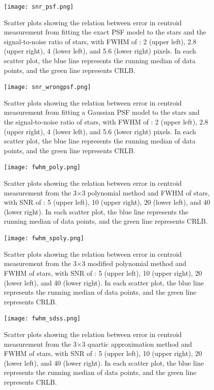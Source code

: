 \documentclass[12pt, preprint]{aastex}
\begin{document}
\begin{figure}[!htb]
  \texttt{[image: snr\_psf.png]}
\endminipage
\caption{Scatter plots showing the relation between error in centroid measurement
from fitting the exact PSF model to the stars and the signal-to-noise ratio of stars,
with FWHM of : 2 (upper left), 2.8 (upper right), 4 (lower left), and 5.6 (lower right)
pixels. In each scatter plot, the blue line represents the running median of data points,
and the green line represents CRLB.}\label{5}
\end{figure}

\begin{figure}[!htb]
  \texttt{[image: snr\_wrongpsf.png]}
\endminipage
\caption{Scatter plots showing the relation between error in centroid
measurement from fitting a Gaussian PSF model to the stars and the signal-to-noise
ratio of stars, with FWHM of : 2 (upper left), 2.8 (upper right), 4 (lower left),
and 5.6 (lower right) pixels. In each scatter plot, the blue line represents the
running median of data points, and the green line represents CRLB.}\label{6}
\end{figure}

\begin{figure}[!htb]
  \texttt{[image: fwhm\_poly.png]}
\endminipage
\caption{Scatter plots showing the relation between error in centroid measurement
from the 3$\times$3 polynomial method and FWHM of stars, with SNR  of : 5 (upper left),
10 (upper right), 20 (lower left), and 40 (lower right). In each scatter plot, the blue
line represents the running median of data points, and the green line represents CRLB.}\label{7}
\end{figure}

\begin{figure}[!htb]
  \texttt{[image: fwhm\_spoly.png]}
\endminipage
\caption{Scatter plots showing the relation between error in centroid measurement
from the 3$\times$3 modified polynomial method and FWHM of stars, with SNR  of 
: 5 (upper left), 10 (upper right), 20 (lower left), and 40 (lower right). In each
scatter plot, the blue line represents the running median of data points, and the
green line represents CRLB.}\label{8}
\end{figure}

\begin{figure}[!htb]
  \texttt{[image: fwhm\_sdss.png]}
\endminipage
\caption{Scatter plots showing the relation between error in centroid measurement from
the 3$\times$3 quartic approximation method and FWHM of stars, with SNR  of : 5 (upper left),
10 (upper right), 20 (lower left), and 40 (lower right). In each scatter plot, the blue line
represents the running median of data points, and the green line represents CRLB.}\label{9}
\end{figure}
\end{document}
